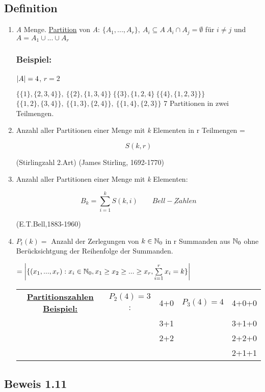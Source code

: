\subsection{Definition}
\begin{enumerate}
	\item \textit{A} Menge. \underline{Partition} von \textit{A}: $\{ A_1,...,A_r \},~ A_i \subseteq A~ A_i\cap A_j = \emptyset$ für $i\neq j$ und $A = A_1 \cup ... \cup A_r$ 
	\subsubsection*{Beispiel:}
	$\left|A\right|= 4$, $r=2$
	
	$\{\{1\}, \{2,3,4\}\},~ \{\{2\}, \{1,3,4\}\}~ \{\{3\}, \{1,2,4\}~ \{\{4\}, \{1,2,3\}\}\}$
	$\{\{1,2\}, \{3,4\}\},~\{\{1,3\}, \{2,4\}\},~\{\{1,4\}, \{2,3\}\}$ 7 Partitionen in zwei Teilmengen.
	
	\item Anzahl aller Partitionen einer Menge mit \textit{k} Elementen in r Teilmengen = 
	
	$$S(k,r)$$
	\begin{center}
	(Stirlingzahl 2.Art) \qquad \qquad  (James Stirling, 1692-1770)
	\end{center}
	
	\item Anzahl aller Partitionen einer Menge mit \textit{k} Elementen:
	
	$$ B_k = \sum_{i=1}^{k} S(k,i) \qquad \underline{Bell-Zahlen}$$
	\begin{center}
		(E.T.Bell,1883-1960)
	\end{center}
	
	\item $P_t(k) = $ Anzahl der Zerlegungen von $k\in \operatorname{\mathbb{N}}_0$ in r Summanden aus $\operatorname{\mathbb{N}}_0$ ohne Berücksichtgung der Reihenfolge der Summanden.
	
	$=\abs{\{(x_1,...,x_r): x_i \in \N_0, x_1 \geq x_2 \geq ... \geq x_r, \sum_{i=1}^{r} x_i=k\}} $
	
	\begin{tabular}{c c c c c}
	\underline{\textbf{Partitionszahlen Beispiel:}}	&	$P_2(4)=3$:& 4+0 & $P_3(4)=4$	& 4+0+0 \\
												 	&  			& 3+1    &				& 3+1+0 \\
													&   		& 2+2 	 & 				& 2+2+0 \\ 
													& 			&		 &				& 2+1+1 \\
	\end{tabular}


\end{enumerate}

\subsection*{Beweis 1.11}
